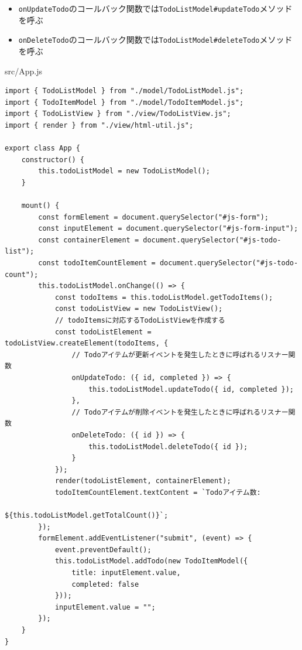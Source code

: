 \begin{itemize}
\item
  \texttt{onUpdateTodo}のコールバック関数では\texttt{TodoListModel\#updateTodo}メソッドを呼ぶ
\item
  \texttt{onDeleteTodo}のコールバック関数では\texttt{TodoListModel\#deleteTodo}メソッドを呼ぶ
\end{itemize}

\begin{listtitle}
src/App.js
\end{listtitle}
\begin{lstlisting}
import { TodoListModel } from "./model/TodoListModel.js";
import { TodoItemModel } from "./model/TodoItemModel.js";
import { TodoListView } from "./view/TodoListView.js";
import { render } from "./view/html-util.js";

export class App {
    constructor() {
        this.todoListModel = new TodoListModel();
    }

    mount() {
        const formElement = document.querySelector("#js-form");
        const inputElement = document.querySelector("#js-form-input");
        const containerElement = document.querySelector("#js-todo-list");
        const todoItemCountElement = document.querySelector("#js-todo-count");
        this.todoListModel.onChange(() => {
            const todoItems = this.todoListModel.getTodoItems();
            const todoListView = new TodoListView();
            // todoItemsに対応するTodoListViewを作成する
            const todoListElement = todoListView.createElement(todoItems, {
                // Todoアイテムが更新イベントを発生したときに呼ばれるリスナー関数
                onUpdateTodo: ({ id, completed }) => {
                    this.todoListModel.updateTodo({ id, completed });
                },
                // Todoアイテムが削除イベントを発生したときに呼ばれるリスナー関数
                onDeleteTodo: ({ id }) => {
                    this.todoListModel.deleteTodo({ id });
                }
            });
            render(todoListElement, containerElement);
            todoItemCountElement.textContent = `Todoアイテム数: 
                                      ${this.todoListModel.getTotalCount()}`;
        });
        formElement.addEventListener("submit", (event) => {
            event.preventDefault();
            this.todoListModel.addTodo(new TodoItemModel({
                title: inputElement.value,
                completed: false
            }));
            inputElement.value = "";
        });
    }
}
\end{lstlisting}
\listend

